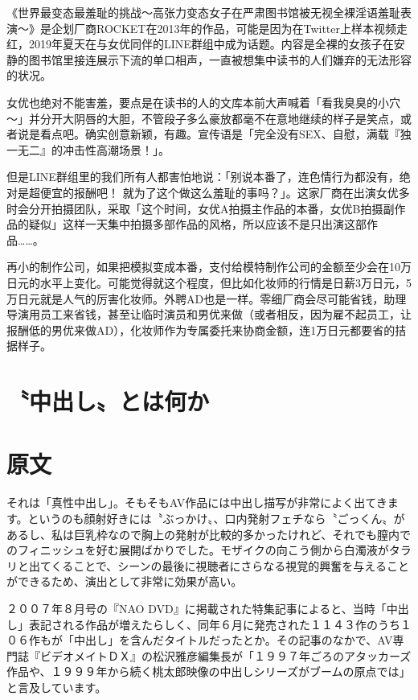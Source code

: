 \documentclass[12pt,UTF8]{ctexbook}
\begin{document}
《世界最变态最羞耻的挑战～高张力变态女子在严肃图书馆被无视全裸淫语羞耻表演～》是企划厂商ROCKET在2013年的作品，可能是因为在Twitter上样本视频走红，2019年夏天在与女优同伴的LINE群组中成为话题。内容是全裸的女孩子在安静的图书馆里接连展示下流的单口相声，一直被想集中读书的人们嫌弃的无法形容的状况。

女优也绝对不能害羞，要点是在读书的人的文库本前大声喊着「看我臭臭的小穴～」并分开大阴唇的大胆，不管段子多么豪放都毫不在意地继续的样子是笑点，或者说是看点吧。确实创意新颖，有趣。宣传语是「完全没有SEX、自慰，满载『独一无二』的冲击性高潮场景！」。

但是LINE群组里的我们所有人都害怕地说：「别说本番了，连色情行为都没有，绝对是超便宜的报酬吧！ 就为了这个做这么羞耻的事吗？」。这家厂商在出演女优多时会分开拍摄团队，采取「这个时间，女优A拍摄主作品的本番，女优B拍摄副作品的疑似」这样一天集中拍摄多部作品的风格，所以应该不是只出演这部作品……。

再小的制作公司，如果把模拟变成本番，支付给模特制作公司的金额至少会在10万日元的水平上变化。可能觉得就这个程度，但比如化妆师的行情是日薪3万日元，5万日元就是人气的厉害化妆师。外聘AD也是一样。零细厂商会尽可能省钱，助理导演用员工来省钱，甚至让临时演员和男优来做（或者相反，因为雇不起员工，让报酬低的男优来做AD），化妆师作为专属委托来协商金额，连1万日元都要省的拮据样子。

\switchcolumn

\section{〝中出し〟とは何か}

\switchcolumn

\section*{原文}

それは「真性中出し」。そもそもAV作品には中出し描写が非常によく出てきます。というのも顔射好きには〝ぶっかけ〟、口内発射フェチなら〝ごっくん〟があるし、私は巨乳枠なので胸上の発射が比較的多かったけれど、それでも膣内でのフィニッシュを好む展開ばかりでした。モザイクの向こう側から白濁液がタラリと出てくることで、シーンの最後に視聴者にさらなる視覚的興奮を与えることができるため、演出として非常に効果が高い。

２００７年８月号の『NAO DVD』に掲載された特集記事によると、当時「中出し」表記される作品が増えたらしく、同年６月に発売された１１４３作のうち１０６作もが「中出し」を含んだタイトルだったとか。その記事のなかで、AV専門誌『ビデオメイトＤＸ』の松沢雅彦編集長が「１９９７年ごろのアタッカーズ作品や、１９９９年から続く桃太郎映像の中出しシリーズがブームの原点では」と言及しています。
\end{document}
